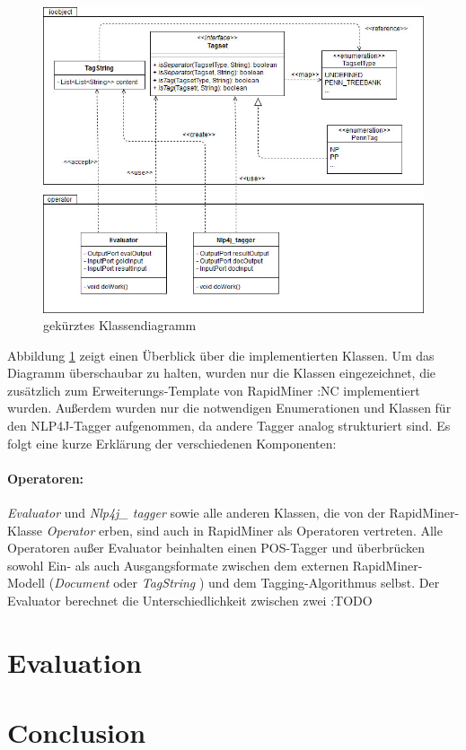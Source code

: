 \begin{figure}[htb]
	\includegraphics[width=\textwidth]{gfx/UML_Overview_simple.jpg}
	\caption{gekürztes Klassendiagramm}
	\label{fig:impl:structure:overview:uml}
\end{figure}

Abbildung \ref{fig:impl:structure:overview:uml} zeigt einen Überblick über die implementierten Klassen. Um das Diagramm überschaubar zu halten, wurden nur die Klassen eingezeichnet, die zusätzlich zum Erweiterungs-Template von RapidMiner :NC implementiert wurden. Außerdem wurden nur die notwendigen Enumerationen und Klassen für den NLP4J-Tagger aufgenommen, da andere Tagger analog strukturiert sind. Es folgt eine kurze Erklärung der verschiedenen Komponenten:

\paragraph{Operatoren:} \textit{Evaluator} und \textit{Nlp4j\_ tagger} sowie alle anderen Klassen, die von der RapidMiner-Klasse \textit{Operator} erben, sind auch in RapidMiner als Operatoren vertreten. Alle Operatoren außer Evaluator beinhalten einen POS-Tagger und überbrücken sowohl Ein- als auch Ausgangsformate zwischen dem externen RapidMiner-Modell (\textit{Document} oder \textit{TagString} ) und dem Tagging-Algorithmus selbst. Der Evaluator berechnet die Unterschiedlichkeit zwischen zwei  :TODO

\section{Evaluation}
\label{sec:impl:eval}

\section{Conclusion}
\label{sec:system:conclusion}

